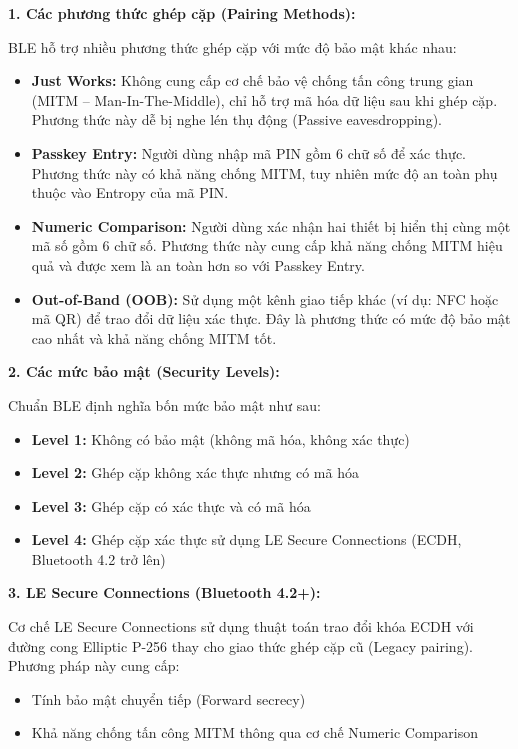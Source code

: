 \medskip
\par\vspace{0.5em}
\textbf{1. Các phương thức ghép cặp (Pairing Methods):}
\par\vspace{0.3em}
BLE hỗ trợ nhiều phương thức ghép cặp với mức độ bảo mật khác nhau:
\begin{itemize}
\item \textbf{Just Works:}
Không cung cấp cơ chế bảo vệ chống tấn công trung gian (MITM – Man-In-The-Middle), chỉ hỗ trợ mã hóa dữ liệu sau khi ghép cặp. Phương thức này dễ bị nghe lén thụ động (Passive eavesdropping).

\item \textbf{Passkey Entry:}  
Người dùng nhập mã PIN gồm 6 chữ số để xác thực. Phương thức này có khả năng chống MITM, tuy nhiên mức độ an toàn phụ thuộc vào Entropy của mã PIN.

\item \textbf{Numeric Comparison:}  
Người dùng xác nhận hai thiết bị hiển thị cùng một mã số gồm 6 chữ số. Phương thức này cung cấp khả năng chống MITM hiệu quả và được xem là an toàn hơn so với Passkey Entry.

\item \textbf{Out-of-Band (OOB):}  
Sử dụng một kênh giao tiếp khác (ví dụ: NFC hoặc mã QR) để trao đổi dữ liệu xác thực. Đây là phương thức có mức độ bảo mật cao nhất và khả năng chống MITM tốt.

\end{itemize}

\medskip
\par\vspace{0.5em}
\textbf{2. Các mức bảo mật (Security Levels):}
\par\vspace{0.3em}
Chuẩn BLE định nghĩa bốn mức bảo mật như sau:
\begin{itemize}
\item \textbf{Level 1:} Không có bảo mật (không mã hóa, không xác thực)
\item \textbf{Level 2:} Ghép cặp không xác thực nhưng có mã hóa
\item \textbf{Level 3:} Ghép cặp có xác thực và có mã hóa
\item \textbf{Level 4:} Ghép cặp xác thực sử dụng LE Secure Connections (ECDH, Bluetooth 4.2 trở lên)
\end{itemize}

\medskip
\par\vspace{0.5em}
\textbf{3. LE Secure Connections (Bluetooth 4.2+):}
\par\vspace{0.3em}
Cơ chế LE Secure Connections sử dụng thuật toán trao đổi khóa ECDH với đường cong Elliptic P-256 thay cho giao thức ghép cặp cũ (Legacy pairing).
Phương pháp này cung cấp:
\begin{itemize}
\item Tính bảo mật chuyển tiếp (Forward secrecy)
\item Khả năng chống tấn công MITM thông qua cơ chế Numeric Comparison
\end{itemize}

